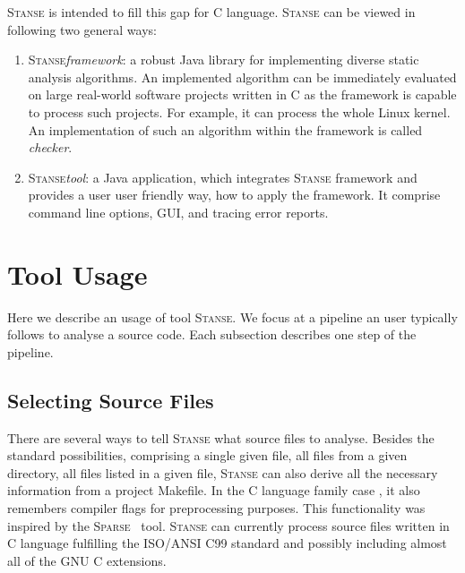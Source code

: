 \documentclass[10pt]{llncs}
\newcommand\Color[2]{\textcolor{#1}{#2}}
\newcommand{\nb}[1]{\marginpar{\scriptsize #1}}
\newcommand\todo[1]{\nb{\Color{red}{#1}}}
\newcommand{\Stanse}{\textsc{Stanse}\xspace}
\begin{document}
\Stanse is intended to fill this gap for C language. \Stanse can be viewed in following two general ways:
\begin{enumerate}
\item \Stanse \emph{framework}: a robust Java library for implementing diverse static analysis algorithms. An implemented algorithm can be immediately evaluated on large real-world software projects written in C as the framework is capable to process such projects. For example, it can process the whole Linux kernel. An implementation of such an algorithm within the framework is called \emph{checker}.
\item \Stanse \emph{tool}: a Java application, which integrates \Stanse framework and provides a user user friendly way, how to apply the framework. It comprise command line options, GUI, and tracing error reports.
\end{enumerate}


\section{Tool Usage}

Here we describe an usage of tool \Stanse. We focus at a pipeline an user typically follows to analyse a source code. Each subsection describes one step of the pipeline.

\subsection{Selecting Source Files}

There are several ways to tell \Stanse what source files to analyse. Besides the standard possibilities, comprising a single given file, all files from a given directory, all files listed in a given file, \Stanse can also derive all the necessary information from a project \textsf{Makefile}. In the C language family case \todo{Why is there: "In the C language family case"}, it also remembers compiler flags for preprocessing purposes. This functionality was inspired by the \textsc{Sparse}~\cite{sparse} tool. \Stanse can currently process source files written in C language fulfilling the ISO/ANSI C99 standard and possibly including almost all of the GNU C extensions.
\end{document}
